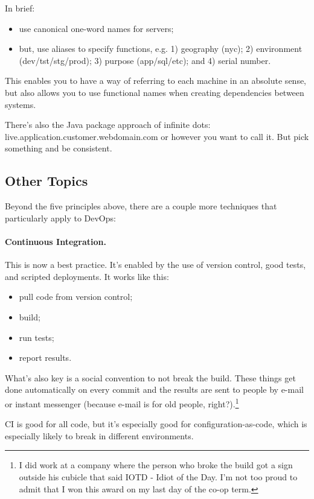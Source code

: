 \documentclass[a4paper]{report}
\begin{document}
In brief:
\begin{itemize}
\item use canonical one-word names for servers;
\item but, use aliases to specify functions, e.g. 1) geography (nyc); 2) environment (dev/tst/stg/prod); 
3) purpose (app/sql/etc); and 4) serial number.
\end{itemize}
This enables you to have a way of referring to each machine in an absolute sense, but also 
allows you to use functional names when creating dependencies between systems.

There's also the Java package approach of infinite dots: live.application.customer.webdomain.com or however you want to call it. But pick something and be consistent.

\subsection*{Other Topics}
Beyond the five principles above, there are a couple more techniques that particularly apply to
DevOps:

\paragraph{Continuous Integration.} 
This is now a best practice. It's enabled by the use of version control, good tests, and scripted deployments.
It works like this:
\begin{itemize}
\item pull code from version control;
\item build;
\item run tests;
\item report results.
\end{itemize}
What's also key is a social convention to not break the build. These things get done automatically on every commit and the results are sent to people by e-mail or instant messenger (because e-mail is for old people, right?).\footnote{I did work at a company where the person who broke the build got a sign outside his cubicle that said IOTD - Idiot of the Day. I'm not too proud to admit that I won this award on my last day of the co-op term.}


CI is good for all code, but it's especially good for configuration-as-code, which is especially likely
to break in different environments.
\end{document}

